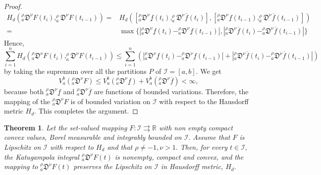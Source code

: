 \documentclass{amsproc}
\newtheorem{theorem}{Theorem}[section]
\theoremstyle{definition}
\theoremstyle{remark}
\numberwithin{equation}{section}
\begin{document}
\begin{proof}
      \begin{equation*}
          \begin{aligned}
       H_d(_a^\rho\mathfrak{D}^\nu F(t_i),_a^\rho\mathfrak{D}^\nu F(t_{i-1}))=& H_d([_a^\rho\mathfrak{D}^\nu \underline{f}(t_i),_a^\rho\mathfrak{D}^\nu \overline{f}(t_i)],[_a^\rho\mathfrak{D}^\nu \underline{f}(t_{i-1}),_a^\rho\mathfrak{D}^\nu \overline{f}(t_{i-1})]) \\
       =& \max\{|_a^\rho\mathfrak{D}^\nu \underline{f}(t_i)-_a^\rho\mathfrak{D}^\nu \underline{f}(t_{i-1})|,|_a^\rho\mathfrak{D}^\nu \overline{f}(t_i)-_a^\rho\mathfrak{D}^\nu \overline{f}(t_{i-1})| \}
        \end{aligned}
      \end{equation*} 
      Hence, 
      \[ \sum_{i=1}^n H_d(_a^\rho\mathfrak{D}^\nu F(t_i),_a^\rho\mathfrak{D}^\nu F(t_{i-1})) \le \sum_{i=1}^n (|_a^\rho\mathfrak{D}^\nu \underline{f}(t_i)-_a^\rho\mathfrak{D}^\nu \underline{f}(t_{i-1})|+|_a^\rho\mathfrak{D}^\nu \overline{f}(t_i)-_a^\rho\mathfrak{D}^\nu \overline{f}(t_{i-1})| ) \] 
      by taking the supremum over all the partitions $P$ of $\mathcal{I}=[a,b].$ We get 
      \[ V_a^b(_a^\rho\mathfrak{D}^\nu F ) \le V_a^b(_a^\rho\mathfrak{D}^\nu \underline{f}) +V_a^b(_a^\rho\mathfrak{D}^\nu \overline{f})< \infty,\] 
      because both $_a^\rho\mathfrak{D}^\nu \underline{f}$ and $_a^\rho\mathfrak{D}^\nu \overline{f}$ are functions of bounded variations. Therefore, the mapping of the $_a^\rho\mathfrak{D}^\nu F$ is of bounded variation on $\mathcal{I}$ with respect to the Hausdorff metric $H_d.$ This completes the argument.  
 \end{proof}
 \begin{theorem}
   Let the set-valued mapping $F:\mathcal{I} \rightrightarrows \mathbb{R} $ with non empty compact convex values, Borel measurable and integrably bounded on $\mathcal{I}.$ Assume that $F$ is Lipschitz on $\mathcal{I}$ with respect to $H_d$ and that $\rho \neq -1, \nu >1.$ Then, for every $t\in \mathcal{I},$ the Katugampola integral $_a^\rho\mathfrak{D}^\nu F(t)$ is nonempty, compact and convex, and the mapping to $_a^\rho\mathfrak{D}^\nu F(t)$ preserves the Lipschitz on $\mathcal{I}$ in Hausdorff metric, $H_d.$
     \end{theorem}
\end{document}
